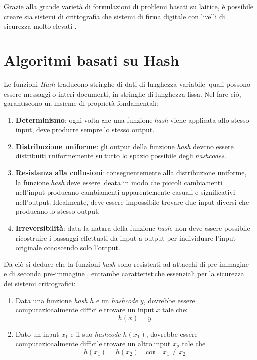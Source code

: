 Grazie alla grande varietà di formulazioni di problemi basati su lattice, è possibile creare sia sistemi di crittografia che sistemi di firma digitale con livelli di sicurezza molto elevati \cite{nature-pqc}.

\section{Algoritmi basati su Hash}

Le funzioni \textit{Hash} traducono stringhe di dati di lunghezza variabile, quali possono essere messaggi o interi documenti, in stringhe di lunghezza fissa. Nel fare ciò, garantiscono un insieme di proprietà fondamentali:
\begin{enumerate}
    \item \textbf{Determinismo}: ogni volta che una funzione \textit{hash} viene applicata allo stesso input, deve produrre sempre lo stesso output.
    \item \textbf{Distribuzione uniforme}: gli output della funzione \textit{hash} devono essere distribuiti uniformemente su tutto lo spazio possibile degli \textit{hashcodes}.
    \item \textbf{Resistenza alla collusioni}: conseguentemente alla distribuzione uniforme, la funzione \textit{hash} deve essere ideata in modo che piccoli cambiamenti nell'input producano cambiamenti apparentemente casuali e significativi nell'output. Idealmente, deve essere impossibile trovare due input diversi che producano lo stesso output.
    \item \textbf{Irreversibilità}: data la natura della funzione \textit{hash}, non deve essere possibile ricostruire i passaggi effettuati da input a output per individuare l'input originale conoscendo solo l'output.
\end{enumerate}

Da ciò si deduce che la funzioni \textit{hash} sono resistenti ad attacchi di pre-immagine e di seconda pre-immagine \cite{iot-hashbasedpqc}, entrambe caratteristiche essenziali per la sicurezza dei sistemi crittografici:
\begin{enumerate}
    \item Data una funzione \textit{hash} \( h \) e un \textit{hashcode} \( y \), dovrebbe essere computazionalmente difficile trovare un input \( x \) tale che: \[ h(x) = y \]
    \item Dato un input \( x_1 \) e il suo \textit{hashcode} \( h(x_1) \), dovrebbe essere computazionalmente difficile trovare un altro input \( x_2 \) tale che: \[ h(x_1) = h(x_2) \quad \text{con} \quad x_1 \neq x_2 \]
\end{enumerate}

